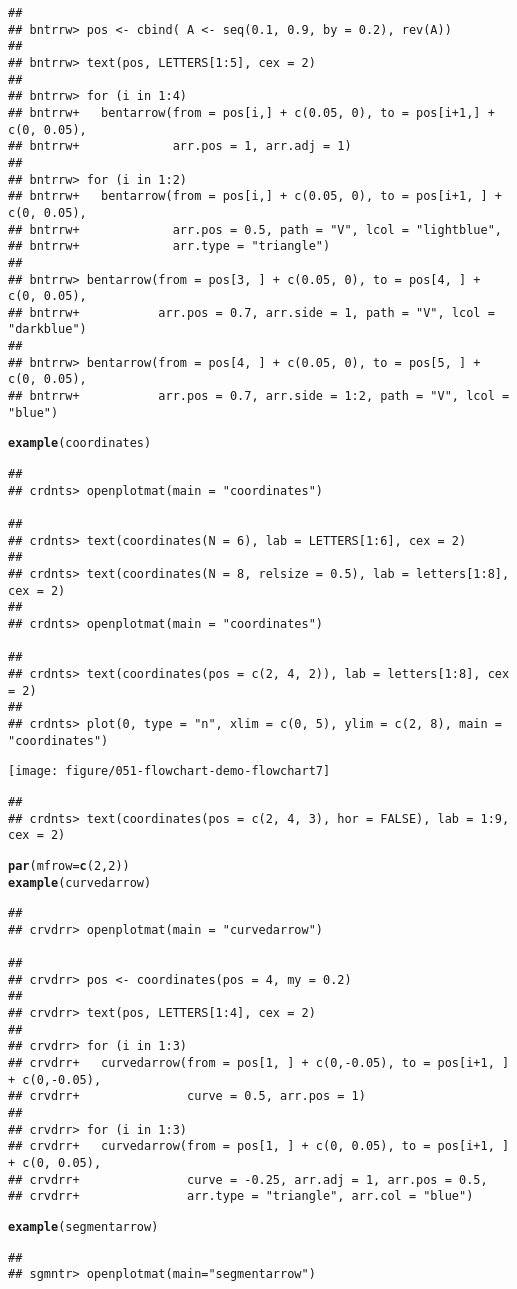 \documentclass{article}\usepackage{graphicx, color}
\makeatletter
\def\maxwidth{ %
  \ifdim\Gin@nat@width>\linewidth
    \linewidth
  \else
    \Gin@nat@width
  \fi
}
\newcommand{\hlfunctioncall}[1]{\textcolor[rgb]{0.501960784313725,0,0.329411764705882}{\textbf{#1}}}%
\newenvironment{kframe}{%
 \def\at@end@of@kframe{}%
 \ifinner\ifhmode%
  \def\at@end@of@kframe{\end{minipage}}%
  \begin{minipage}{\columnwidth}%
 \fi\fi%
 \def\FrameCommand##1{\hskip\@totalleftmargin \hskip-\fboxsep
 \colorbox{shadecolor}{##1}\hskip-\fboxsep
     \hskip-\linewidth \hskip-\@totalleftmargin \hskip\columnwidth}%
 \MakeFramed {\advance\hsize-\width
   \@totalleftmargin\z@ \linewidth\hsize
   \@setminipage}}%
 {\par\unskip\endMakeFramed%
 \at@end@of@kframe}
\newenvironment{knitrout}{}{} %
\makeatother
\begin{document}
\begin{knitrout}
\begin{kframe}
\begin{verbatim}
## 
## bntrrw> pos <- cbind( A <- seq(0.1, 0.9, by = 0.2), rev(A))
## 
## bntrrw> text(pos, LETTERS[1:5], cex = 2)
## 
## bntrrw> for (i in 1:4) 
## bntrrw+   bentarrow(from = pos[i,] + c(0.05, 0), to = pos[i+1,] + c(0, 0.05),
## bntrrw+             arr.pos = 1, arr.adj = 1)
## 
## bntrrw> for (i in 1:2) 
## bntrrw+   bentarrow(from = pos[i,] + c(0.05, 0), to = pos[i+1, ] + c(0, 0.05),
## bntrrw+             arr.pos = 0.5, path = "V", lcol = "lightblue", 
## bntrrw+             arr.type = "triangle")
## 
## bntrrw> bentarrow(from = pos[3, ] + c(0.05, 0), to = pos[4, ] + c(0, 0.05),
## bntrrw+           arr.pos = 0.7, arr.side = 1, path = "V", lcol = "darkblue")
## 
## bntrrw> bentarrow(from = pos[4, ] + c(0.05, 0), to = pos[5, ] + c(0, 0.05),
## bntrrw+           arr.pos = 0.7, arr.side = 1:2, path = "V", lcol = "blue")
\end{verbatim}
\begin{alltt}
\hlfunctioncall{example}(coordinates)
\end{alltt}
\begin{verbatim}
## 
## crdnts> openplotmat(main = "coordinates")

## 
## crdnts> text(coordinates(N = 6), lab = LETTERS[1:6], cex = 2)
## 
## crdnts> text(coordinates(N = 8, relsize = 0.5), lab = letters[1:8], cex = 2)
## 
## crdnts> openplotmat(main = "coordinates")

## 
## crdnts> text(coordinates(pos = c(2, 4, 2)), lab = letters[1:8], cex = 2)
## 
## crdnts> plot(0, type = "n", xlim = c(0, 5), ylim = c(2, 8), main = "coordinates")
\end{verbatim}
\end{kframe}
\texttt{[image: figure/051-flowchart-demo-flowchart7]} 
\begin{kframe}\begin{verbatim}
## 
## crdnts> text(coordinates(pos = c(2, 4, 3), hor = FALSE), lab = 1:9, cex = 2)
\end{verbatim}
\begin{alltt}
\hlfunctioncall{par}(mfrow = \hlfunctioncall{c}(2, 2))
\hlfunctioncall{example}(curvedarrow)
\end{alltt}
\begin{verbatim}
## 
## crvdrr> openplotmat(main = "curvedarrow")

## 
## crvdrr> pos <- coordinates(pos = 4, my = 0.2)
## 
## crvdrr> text(pos, LETTERS[1:4], cex = 2)
## 
## crvdrr> for (i in 1:3) 
## crvdrr+   curvedarrow(from = pos[1, ] + c(0,-0.05), to = pos[i+1, ] + c(0,-0.05),
## crvdrr+               curve = 0.5, arr.pos = 1)
## 
## crvdrr> for (i in 1:3) 
## crvdrr+   curvedarrow(from = pos[1, ] + c(0, 0.05), to = pos[i+1, ] + c(0, 0.05),
## crvdrr+               curve = -0.25, arr.adj = 1, arr.pos = 0.5, 
## crvdrr+               arr.type = "triangle", arr.col = "blue")
\end{verbatim}
\begin{alltt}
\hlfunctioncall{example}(segmentarrow)
\end{alltt}
\begin{verbatim}
## 
## sgmntr> openplotmat(main="segmentarrow")


\end{verbatim}
\end{kframe}
\end{knitrout}
\end{document}

